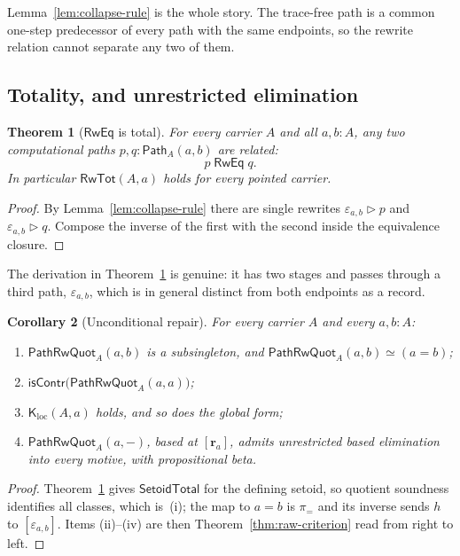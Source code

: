 \documentclass[10pt,reqno]{amsart}
\newtheorem{theorem}{Theorem}[section]
\newtheorem{corollary}[theorem]{Corollary}
\newcommand{\isContr}{\mathsf{isContr}}
\newcommand{\Eqv}{\simeq}
\newcommand{\RwTot}{\mathsf{RwTot}}
\newcommand{\PathTy}{\mathsf{Path}}
\newcommand{\SetTot}{\mathsf{SetoidTotal}}
\newcommand{\PRW}{\mathsf{PathRwQuot}}
\newcommand{\LocalK}{\mathsf K_{\mathrm{loc}}}
\begin{document}
Lemma~\ref{lem:collapse-rule} is the whole story.  The trace-free path is a
common one-step predecessor of every path with the same endpoints, so the
rewrite relation cannot separate any two of them.

\subsection{Totality, and unrestricted elimination}

\begin{theorem}[\(\mathsf{RwEq}\) is total]
\label{thm:rweq-total}
For every carrier \(A\) and all \(a,b:A\), any two computational paths
\(p,q:\PathTy_A(a,b)\) are related:
\[
 p\;\mathrel{\mathsf{RwEq}}\;q .
\tag{11.5}\label{eq:rweq-total-thm}
\]
In particular \(\RwTot(A,a)\) holds for every pointed carrier.
\end{theorem}

\begin{proof}
By Lemma~\ref{lem:collapse-rule} there are single rewrites
\(\varepsilon_{a,b}\triangleright p\) and
\(\varepsilon_{a,b}\triangleright q\).  Compose the inverse of the first with
the second inside the equivalence closure.
\end{proof}

The derivation in Theorem~\ref{thm:rweq-total} is genuine: it has two stages and
passes through a third path, \(\varepsilon_{a,b}\), which is in general distinct
from both endpoints as a record.

\begin{corollary}[Unconditional repair]
\label{cor:unconditional-repair}
For every carrier \(A\) and every \(a,b:A\):
\begin{enumerate}[label=(\roman*),itemsep=1pt,topsep=3pt]
\item \(\PRW_A(a,b)\) is a subsingleton, and
  \(\PRW_A(a,b)\Eqv(a=b)\);
\item \(\isContr\bigl(\PRW_A(a,a)\bigr)\);
\item \(\LocalK(A,a)\) holds, and so does the global form;
\item \(\PRW_A(a,-)\), based at \([\mathbf r_a]\), admits unrestricted based
  elimination into every motive, with propositional beta.
\end{enumerate}
\end{corollary}

\begin{proof}
Theorem~\ref{thm:rweq-total} gives \(\SetTot\) for the defining setoid, so
quotient soundness identifies all classes, which is~(i); the map to \(a=b\) is
\(\pi_{=}\) and its inverse sends \(h\) to \([\varepsilon_{a,b}]\).  Items
(ii)--(iv) are then Theorem~\ref{thm:raw-criterion} read from right to left.
\end{proof}
\end{document}
